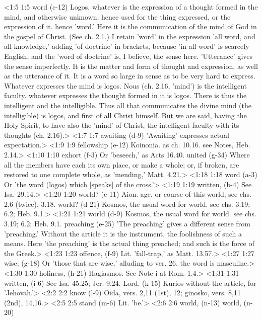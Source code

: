 <1:5 1:5  word (c-12)  Logos, whatever is the expression of a thought formed in  the mind, and otherwise unknown; hence used for the thing  expressed, or the expression of it. hence 'word.' Here it is  the communication of the mind of God in the gospel of Christ.  (See ch. 2.1.) I retain 'word' in the expression 'all word, and  all knowledge,' adding 'of doctrine' in brackets, because 'in  all word' is scarcely English, and the 'word of doctrine' is, I  believe, the sense here. 'Utterance' gives the sense  imperfectly. It is the matter and form of thought and  expression, as well as the utterance of it. It is a word so  large in sense as to be very hard to express. Whatever  expresses the mind is logos. Nous (ch. 2.16, 'mind') is the  intelligent faculty. whatever expresses the thought formed in  it is logos. There is thus the intelligent and the  intelligible. Thus all that communicates the divine mind (the  intelligible) is logos, and first of all Christ himself. But  we are said, having the Holy Spirit, to have also the 'mind' of  Christ, the intelligent faculty with its thoughts (ch. 2.16).>
<1:7 1:7  awaiting (d-9)  'Awaiting' expresses actual expectation.>
<1:9 1:9  fellowship (e-12)  Koinonia. as ch. 10.16. see Notes, Heb. 2.14.>
<1:10 1:10  exhort (f-3)  Or 'beseech,' as Acts 16.40.
  united (g-34)  Where all the members have each its own place, or make a  whole; or, if broken, are restored to one complete whole, as  'mending,' Matt. 4.21.>
<1:18 1:18  word (a-3)  Or 'the word (logos) which [speaks] of the cross.'>
<1:19 1:19  written, (b-4)  See Isa. 29.14.>
<1:20 1:20  world? (c-11)  Aion. age, or course of this world, see chs. 2.6 (twice), 3.18.
  world? (d-21)  Kosmos, the usual word for world. see chs. 3.19; 6.2; Heb. 9.1.>
<1:21 1:21  world (d-9)  Kosmos, the usual word for world. see chs. 3.19; 6.2; Heb. 9.1.
  preaching (e-25)  'The preaching' gives a different sense from 'preaching.'  Without the article it is the instrument, the foolishness of  such a means. Here 'the preaching' is the actual thing  preached; and such is the force of the Greek.>
<1:23 1:23  offence, (f-9)  Lit. 'fall-trap,' as Matt. 13.57.>
<1:27 1:27  wise; (g-18)  Or 'those that are wise,' alluding to ver. 26. the word is  masculine.>
<1:30 1:30  holiness, (h-21)  Hagiasmos. See Note i at Rom. 1.4.>
<1:31 1:31  written, (i-6)  See Isa. 45.25; Jer. 9.24.
  Lord. (k-15)  Kurios without the article, for 'Jehovah.'>
<2:2 2:2  know (l-9)  Oida, vers. 2,11 (1st), 12; ginosko, vers. 8,11 (2nd), 14,16.>
<2:5 2:5  stand (m-6)  Lit. 'be.'>
<2:6 2:6  world, (n-13)  world, (n-20)
